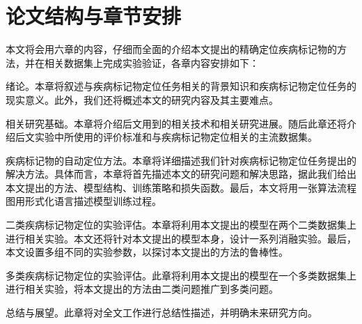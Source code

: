 \section{论文结构与章节安排}\label{sec:arrangement}
本文将会用六章的内容，仔细而全面的介绍本文提出的精确定位疾病标记物的方法，并在相关数据集上完成实验验证，各章内容安排如下：
\begin{description}[style=multiline,leftmargin=1.7cm]
	\item[第一章：] 绪论。本章将叙述与疾病标记物定位任务相关的背景知识和疾病标记物定位任务的现实意义。此外，我们还将概述本文的研究内容及其主要难点。
	\item[第二章：] 相关研究基础。本章将介绍后文用到的相关技术和相关研究进展。随后此章还将介绍后文实验中所使用的评价标准和与疾病标记物定位相关的主流数据集。
	\item[第三章：] 疾病标记物的自动定位方法。本章将详细描述我们针对疾病标记物定位任务提出的解决方法。具体而言，本章将首先描述本文的研究问题和解决思路，据此我们给出本文提出的方法、模型结构、训练策略和损失函数。最后，本文将用一张算法流程图用形式化语言描述模型训练过程。
	\item[第四章：] 二类疾病标记物定位的实验评估。本章将利用本文提出的模型在两个二类数据集上进行相关实验。本文还将针对本文提出的模型本身，设计一系列消融实验。最后，本文设置多组不同的实验参数，以探讨本文提出的方法的鲁棒性。
	\item[第五章：] 多类疾病标记物定位的实验评估。此章将利用本文提出的模型在一个多类数据集上进行相关实验，将本文提出的方法由二类问题推广到多类问题。
	\item[第六章：] 总结与展望。此章将对全文工作进行总结性描述，并明确未来研究方向。
\end{description}